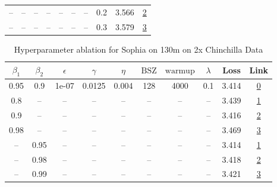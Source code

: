 \begin{table}[H]
\begin{tabular}{cccccccccc}
-- & -- & -- & -- & -- & -- & -- & 0.2 & 3.566 & \href{https://wandb.ai/marin-community/optimizer-scaling/runs/sweep-130m-2B-sophiag262a51lr0.004-wd0.2-minlr0-warmup4000-b10.9-508c87}{2} \\
-- & -- & -- & -- & -- & -- & -- & 0.3 & 3.579 & \href{https://wandb.ai/marin-community/optimizer-scaling/runs/sweep-130m-2B-sophiag140385lr0.004-wd0.3-minlr0-warmup4000-b10.9-843326}{3} \\
\bottomrule
\end{tabular}
\end{table}

\begin{table}[H]
\centering
\caption{Hyperparameter ablation for Sophia on 130m on 2x Chinchilla Data}
\label{tab:ablation_sophia_130m_on_2x_chinchilla_data}
\begin{tabular}{cccccccccc}
\toprule
$\beta_1$ & $\beta_2$ & $\epsilon$ & $\gamma$ & $\eta$ & $\mathrm{BSZ}$ & $\mathrm{warmup}$ & $\lambda$ & Loss & Link \\
\midrule
0.95 & 0.9 & 1e-07 & 0.0125 & 0.004 & 128 & 4000 & 0.1 & 3.414 & \href{https://wandb.ai/marin-community/optimizer-scaling/runs/sweep-130m-5B-sophiaf95b3dlr0.004-wd0.1-minlr0-warmup4000-b10.95-187352}{0} \\
\midrule
0.8 & -- & -- & -- & -- & -- & -- & -- & 3.439 & \href{https://wandb.ai/marin-community/optimizer-scaling/runs/sweep-130m-5B-sophia282c09lr0.004-wd0.1-minlr0-warmup4000-b10.8--b60356}{1} \\
0.9 & -- & -- & -- & -- & -- & -- & -- & 3.416 & \href{https://wandb.ai/marin-community/optimizer-scaling/runs/sweep-130m-5B-sophiae5887flr0.004-wd0.1-minlr0-warmup4000-b10.9--0010c1}{2} \\
0.98 & -- & -- & -- & -- & -- & -- & -- & 3.469 & \href{https://wandb.ai/marin-community/optimizer-scaling/runs/sweep-130m-5B-sophiad61acalr0.004-wd0.1-minlr0-warmup4000-b10.98-0311d7}{3} \\
-- & 0.95 & -- & -- & -- & -- & -- & -- & 3.414 & \href{https://wandb.ai/marin-community/optimizer-scaling/runs/sweep-130m-5B-sophia27d93clr0.004-wd0.1-minlr0-warmup4000-b10.95-0c4238}{1} \\
-- & 0.98 & -- & -- & -- & -- & -- & -- & 3.418 & \href{https://wandb.ai/marin-community/optimizer-scaling/runs/sweep-130m-5B-sophiad1cb34lr0.004-wd0.1-minlr0-warmup4000-b10.95-298f3a}{2} \\
-- & 0.99 & -- & -- & -- & -- & -- & -- & 3.421 & \href{https://wandb.ai/marin-community/optimizer-scaling/runs/sweep-130m-5B-sophia7b63b9lr0.004-wd0.1-minlr0-warmup4000-b10.95-48c5c4}{3} \\

\end{tabular}
\end{table}
